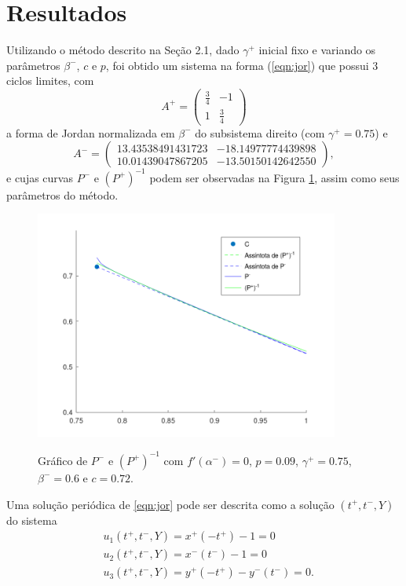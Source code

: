 \section{Resultados}
Utilizando o método descrito na Seção 2.1, dado $\gamma^+$ inicial fixo e variando os parâmetros $ \beta^-$, $c$ e $p$, foi obtido um sistema na forma (\ref{eqn:jor}) que possui 3 ciclos limites, com
\[
A^+=
\begin{pmatrix}
\frac{3}{4}& -1\\
1& \frac{3}{4}
\end{pmatrix}
\]
a forma de Jordan normalizada em $\beta^-$ do subsistema direito (com $\gamma^+=0.75$) e
\[
A^-=
\begin{pmatrix}
13.43538491431723& -18.14977774439898\\
10.01439047867205& -13.50150142642550
\end{pmatrix},
\]
e cujas curvas $P^-$ e $(P^+)^{-1}$ podem ser observadas na Figura \ref{three}, assim como seus parâmetros do método.
\begin{figure}[H]
\centering
\includegraphics[width=10cm]{three}\\
\vspace{\baselineskip}
\caption{\label{three}Gráfico de $P^-$ e $(P^+)^{-1}$ com $f'\left( \alpha^-\right)=0$, $p=0.09$, $\gamma^+=0.75$, $\beta^-=0.6$ e $ c=0.72$.}
\end{figure}

Uma solução periódica de \ref{eqn:jor} pode ser descrita como a solução $(t^+, t^-, Y)$ do sistema
\begin{align}
\label{u}
&u_{1}\left(t^{+}, t^{-}, Y\right)=x^{+}\left(-t^{+}\right)-1=0 \nonumber\\
&u_{2}\left(t^{+}, t^{-}, Y\right)=x^{-}\left(t^{-}\right)-1=0 \\
&u_{3}\left(t^{+}, t^{-}, Y\right)=y^{+}\left(-t^{+}\right)-y^{-}\left(t^{-}\right)=0\nonumber.
\end{align}

